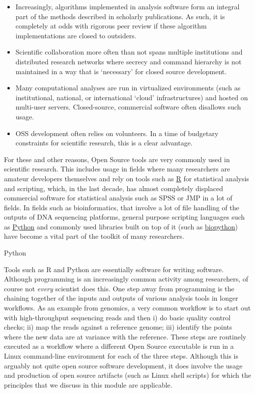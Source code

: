 \documentclass[]{book}
\begin{document}
\begin{itemize}
\item
  Increasingly, algorithms implemented in analysis software form an integral part of the methods described in scholarly publications. As such, it is completely at odds with rigorous peer review if these algorithm implementations are closed to outsiders.
\item
  Scientific collaboration more often than not spans multiple institutions and distributed research networks where secrecy and command hierarchy is not maintained in a way that is `necessary' for closed source development.
\item
  Many computational analyses are run in virtualized environments (such as institutional, national, or international `cloud' infrastructures) and hosted on multi-user servers. Closed-source, commercial software often disallows such usage.
\item
  OSS development often relies on volunteers. In a time of budgetary constraints for scientific research, this is a clear advantage.
\end{itemize}

For these and other reasons, Open Source tools are very commonly used in scientific research. This includes usage in fields where many researchers are amateur developers themselves and rely on tools such as \href{https://www.r-project.org/}{R} for statistical analysis and scripting, which, in the last decade, has almost completely displaced commercial software for statistical analysis such as SPSS or JMP in a lot of fields. In fields such as bioinformatics, that involve a lot of file handling of the outputs of DNA sequencing platforms, general purpose scripting languages such as \href{https://www.python.org/}{Python} and commonly used libraries built on top of it (such as \href{http://biopython.org}{biopython}) have become a vital part of the toolkit of many researchers.

Python

Tools such as R and Python are essentially software for writing software. Although programming is an increasingly common activity among researchers, of course not \emph{every} scientist does this. One step away from programming is the chaining together of the inputs and outputs of various analysis tools in longer workflows. As an example from genomics, a very common workflow is to start out with high-throughput sequencing reads and then i) do basic quality control checks; ii) map the reads against a reference genome; iii) identify the points where the new data are at variance with the reference. These steps are routinely executed as a workflow where a different Open Source executable is run in a Linux command-line environment for each of the three steps. Although this is arguably not quite open source software development, it does involve the usage and production of open source artifacts (such as Linux shell scripts) for which the principles that we discuss in this module are applicable.
\end{document}
